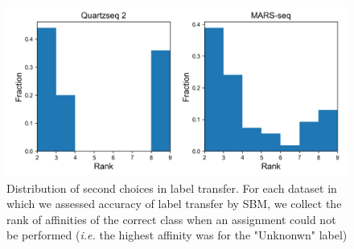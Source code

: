 \documentclass[11pt, titlepage, twoside]{article}
\begin{document}
\begin{figure}[htbp]
\centering
\includegraphics[keepaspectratio,width=\textwidth,height=0.75\textheight]{hist_label_second.png}
\caption[]{Distribution of second choices in label transfer. For each dataset in which we assessed accuracy of label transfer by SBM, we collect the rank of affinities of the correct class when an assignment could not be performed (\emph{i.e.} the highest affinity was for the "Unknonwn" label)  }\label{hist_label_second}
\end{figure}
\clearpage
\end{document}
